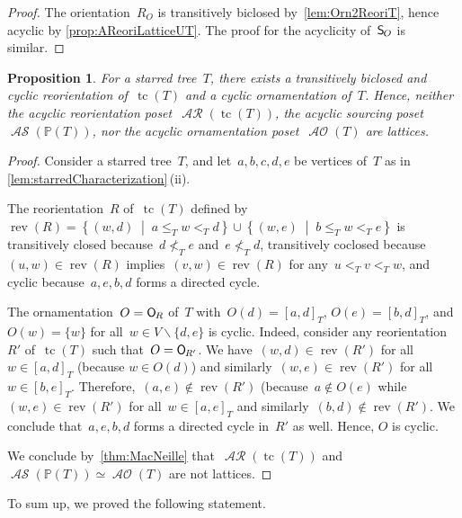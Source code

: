\documentclass{amsart}
\newtheorem{proposition}[theorem]{Proposition}
\theoremstyle{definition}
\renewcommand{\c}[1]{\mathcal{#1}} %
\newcommand{\set}[2]{\left\{ #1 \;\middle|\; #2 \right\}} %
\newcommand{\ssm}{\smallsetminus} %
\DeclareMathOperator{\tc}{tc} %
\newcommand{\mymap}[2]{\mathsf{#1}_{\hspace{-.7pt}#2}}
\newcommand{\orn}[1]{\mymap{O}{#1}}  %
\DeclareMathOperator{\AOrn}{\c{AO}}  %
\DeclareMathOperator{\AReori}{\c{AR}}  %
\DeclareMathOperator{\rev}{rev} %
\newcommand{\sour}[1]{\mymap{S}{#1}}  %
\DeclareMathOperator{\ASour}{\mathcal{AS}}  %
\newcommand{\PP}{\mathbb P} %
\begin{document}
\begin{proof}
The orientation~$R_O$ is transitively biclosed by~\cref{lem:Orn2ReoriT}, hence acyclic by \cref{prop:AReoriLatticeUT}.
The proof for the acyclicity of~$\sour{O}$ is similar.
\end{proof}

\begin{proposition}
For a starred tree~$T$, there exists a transitively biclosed and cyclic reorientation \linebreak of~$\tc(T)$ and a cyclic ornamentation of~$T$.
Hence, neither the acyclic reorientation poset~$\AReori(\tc(T))$, the acyclic sourcing poset~$\ASour(\PP(T))$, nor the acyclic ornamentation poset~$\AOrn(T)$ are lattices.
\end{proposition}

\begin{proof}
Consider a starred tree~$T$, and let~$a,b,c,d,e$ be vertices of~$T$ as in \cref{lem:starredCharacterization}\,(ii).

The reorientation~$R$ of~$\tc(T)$ defined by~$\rev(R) = \set{(w,d)}{a \le_T w <_T d} \cup \set{(w,e)}{b \le_T w <_T e}$ is transitively closed because~$d \not<_T e$ and~$e \not<_T d$, transitively coclosed because~$(u,w) \in \rev(R)$ implies~$(v,w) \in \rev(R)$ for any~$u <_T v <_T w$, and cyclic because~$a, e, b, d$ forms a directed cycle.

The ornamentation~$O = \orn{R}$ of~$T$ with~$O(d) = [a,d]_T$, $O(e) = [b,d]_T$, and~$O(w) = \{w\}$ for all~$w \in V \ssm \{d,e\}$ is cyclic.
Indeed, consider any reorientation~$R'$ of~$\tc(T)$ such that~$O = \orn{R'}$.
We have~$(w,d) \in \rev(R')$ for all~$w \in [a,d]_T$
(because $w \in O(d)$) and similarly~$(w,e) \in \rev(R')$ for all~$w \in [b,e]_T$. %
Therefore,~$(a,e) \notin \rev(R')$ (because~${a \notin O(e)}$ while~$(w,e) \in \rev(R')$ for all~$w \in [a,e]_T$ %
and similarly~$(b,d) \notin \rev(R')$.
We conclude that~$a, e, b, d$ forms a directed cycle in~$R'$ as well.
Hence, $O$ is cyclic.

We conclude by~\cref{thm:MacNeille} that~$\AReori(\tc(T))$ and~$\ASour(\PP(T)) \simeq \AOrn(T)$ are not lattices.
\end{proof}

To sum up, we proved the following statement.
\end{document}
